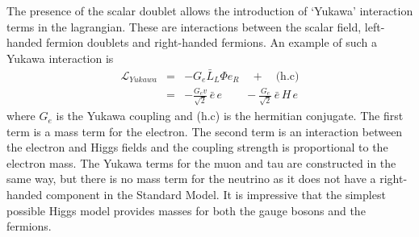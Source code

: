 The presence of the scalar doublet allows the introduction of `Yukawa' interaction terms in the lagrangian. These are interactions between the scalar field, left-handed fermion doublets and right-handed fermions. %
An example of such a Yukawa interaction is 
\begin{eqnarray}\label{yukawa}
\mathcal{L}_{Yukawa} & = & -G_e\bar{L}_{L} \Phi e_R  \quad+\quad \text{(h.c)} \\
& = & -\frac{G_e v}{\sqrt{2}}  \, \bar{e} \, e  \quad  
\quad - \frac{G_e}{\sqrt{2}} \, \bar{e} \, H \, e    \nonumber
\end{eqnarray}
where $G_e$ is the Yukawa coupling and (h.c) is the hermitian conjugate. 
The first term is a mass term for the electron. The second term is an interaction between the electron and Higgs fields and the coupling strength is proportional to the electron mass. The Yukawa terms for the muon and tau are constructed in the same way, but there is no mass term for the neutrino as it does not have a right-handed component in the Standard Model. It is impressive that the simplest possible Higgs model provides masses for both the gauge bosons and the fermions.

